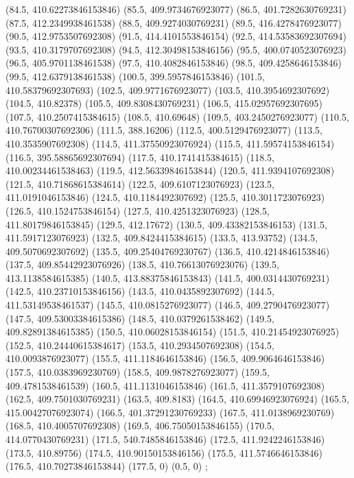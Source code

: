 {{{		(84.5, 410.62273846153846)
		(85.5, 409.9734676923077)
		(86.5, 401.7282630769231)
		(87.5, 412.2349938461538)
		(88.5, 409.9274030769231)
		(89.5, 416.4278476923077)
		(90.5, 412.9753507692308)
		(91.5, 414.4101553846154)
		(92.5, 414.53583692307694)
		(93.5, 410.3179707692308)
		(94.5, 412.30498153846156)
		(95.5, 400.0740523076923)
		(96.5, 405.9701138461538)
		(97.5, 410.4082846153846)
		(98.5, 409.4258646153846)
		(99.5, 412.6379138461538)
		(100.5, 399.5957846153846)
		(101.5, 410.58379692307693)
		(102.5, 409.9771676923077)
		(103.5, 410.3954692307692)
		(104.5, 410.82378)
		(105.5, 409.8308430769231)
		(106.5, 415.02957692307695)
		(107.5, 410.2507415384615)
		(108.5, 410.69648)
		(109.5, 403.2450276923077)
		(110.5, 410.76700307692306)
		(111.5, 388.16206)
		(112.5, 400.5129476923077)
		(113.5, 410.3535907692308)
		(114.5, 411.37550923076924)
		(115.5, 411.59574153846154)
		(116.5, 395.58865692307694)
		(117.5, 410.1741415384615)
		(118.5, 410.00234461538463)
		(119.5, 412.56339846153844)
		(120.5, 411.9394107692308)
		(121.5, 410.71868615384614)
		(122.5, 409.6107123076923)
		(123.5, 411.0191046153846)
		(124.5, 410.1184492307692)
		(125.5, 410.3011723076923)
		(126.5, 410.1524753846154)
		(127.5, 410.4251323076923)
		(128.5, 411.80179846153845)
		(129.5, 412.17672)
		(130.5, 409.43382153846153)
		(131.5, 411.5917123076923)
		(132.5, 409.8424415384615)
		(133.5, 413.93752)
		(134.5, 409.5070692307692)
		(135.5, 409.25404769230767)
		(136.5, 410.4214846153846)
		(137.5, 409.85442923076926)
		(138.5, 410.76613076923076)
		(139.5, 413.1138584615385)
		(140.5, 413.88375846153843)
		(141.5, 400.0314430769231)
		(142.5, 410.23710153846156)
		(143.5, 410.0435892307692)
		(144.5, 411.53149538461537)
		(145.5, 410.0815276923077)
		(146.5, 409.2790476923077)
		(147.5, 409.53003384615386)
		(148.5, 410.0379261538462)
		(149.5, 409.82891384615385)
		(150.5, 410.06028153846154)
		(151.5, 410.21454923076925)
		(152.5, 410.24440615384617)
		(153.5, 410.2934507692308)
		(154.5, 410.0093876923077)
		(155.5, 411.1184646153846)
		(156.5, 409.9064646153846)
		(157.5, 410.0383969230769)
		(158.5, 409.9878276923077)
		(159.5, 409.4781538461539)
		(160.5, 411.1131046153846)
		(161.5, 411.3579107692308)
		(162.5, 409.7501030769231)
		(163.5, 409.8183)
		(164.5, 410.69946923076924)
		(165.5, 415.00427076923074)
		(166.5, 401.37291230769233)
		(167.5, 411.0138969230769)
		(168.5, 410.4005707692308)
		(169.5, 406.75050153846155)
		(170.5, 414.0770430769231)
		(171.5, 540.7485846153846)
		(172.5, 411.9242246153846)
		(173.5, 410.89756)
		(174.5, 410.90150153846156)
		(175.5, 411.5746646153846)
		(176.5, 410.70273846153844)
		(177.5, 0)
		(0.5, 0)
	};

}}

